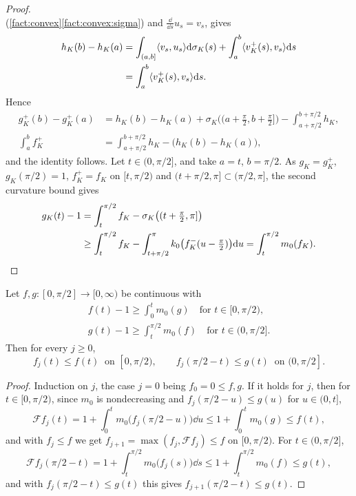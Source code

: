 \begin{proof}
\[\]
(\cref{fact:convex}\ref{fact:convex:sigma}) and $\frac{\dd}{\dd s}u_s=v_s$,
gives
\begin{align*}
  h_K(b)-h_K(a)&=\int_{(a,b]}\langle v_s,u_s\rangle\mathrm{d}\sigma_K(s)
  +\int_a^b\langle v_K^+(s),v_s\rangle\mathrm{d} s\\
  &=\int_a^b\langle v_K^+(s),v_s\rangle\mathrm{d} s.
\end{align*}
Hence
\begin{align*}
  g_K^+(b)-g_K^+(a)&=h_K(b)-h_K(a)+\sigma_K\bigl((a+\tfrac\pi2,b
    +\tfrac\pi2]\bigr)-\int_{a+\pi/2}^{b+\pi/2}h_K,\\
  \int_a^bf_K^+&=\int_{a+\pi/2}^{b+\pi/2}h_K-\bigl(h_K(b)-h_K(a)\bigr),
\end{align*}
and the identity follows. Let $t\in(0,\pi/2]$, and take $a=t$, $b=\pi/2$. As
$g_K=g_K^+$, $g_K(\pi/2)=1$, $f_K^+=f_K$ on $[t,\pi/2)$ and
$(t+\pi/2,\pi]\subset(\pi/2,\pi]$, the second curvature bound gives
\begin{align*}
  g_K(t)-1&=\int_t^{\pi/2}f_K-\sigma_K\bigl((t+\tfrac\pi2,\pi]\bigr)\\
  &\ge\int_t^{\pi/2}f_K-\int_{t+\pi/2}^{\pi}k_0\bigl(f_K^-(u
    -\tfrac\pi2)\bigr)\mathrm{d} u=\int_t^{\pi/2}m_0(f_K).\qedhere
\end{align*}
\end{proof}

\begin{lemma}\label{lem:lower}
Let $f,g:[0,\pi/2]\to[0,\infty)$ be continuous with
\begin{gather*}
  f(t)-1\ge\int_0^tm_0(g)\quad\text{for }t\in[0,\pi/2),\\
  g(t)-1\ge\int_t^{\pi/2}m_0(f)\quad\text{for }t\in(0,\pi/2].
\end{gather*}
Then for every $j\ge0$,
\[
  f_j(t)\le f(t)\ \text{ on }[0,\pi/2),\qquad
  f_j(\pi/2-t)\le g(t)\ \text{ on }(0,\pi/2].
\]
\end{lemma}

\begin{proof}
Induction on $j$, the case $j=0$ being $f_0=0\le f,g$. If it holds for $j$, then
for $t\in[0,\pi/2)$, since $m_0$ is nondecreasing and $f_j(\pi/2-u)\le g(u)$ for
$u\in(0,t]$,
\[
  \mathcal Ff_j(t)=1+\int_0^tm_0\bigl(f_j(\pi/2-u)\bigr)\dd u
  \le1+\int_0^tm_0(g)\le f(t),
\]
and with $f_j\le f$ we get $f_{j+1}=\max(f_j,\mathcal Ff_j)\le f$ on
$[0,\pi/2)$. For $t\in(0,\pi/2]$,
\[
  \mathcal Ff_j(\pi/2-t)=1+\int_t^{\pi/2}m_0\bigl(f_j(s)\bigr)\dd s
  \le1+\int_t^{\pi/2}m_0(f)\le g(t),
\]
and with $f_j(\pi/2-t)\le g(t)$ this gives $f_{j+1}(\pi/2-t)\le g(t)$.
\end{proof}

